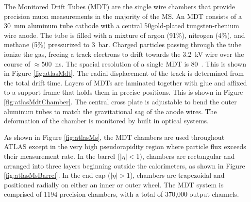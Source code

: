 \begin{figure}[h!]
\captionsetup[subfigure]{position=b}
\centering
{}
\caption{}
\label{fig:}
\end{figure}

The Monitored Drift Tubes (MDT) are the single wire chambers that provide precision muon measurements in the majority of the MS.
An MDT consists of a 30~mm aluminum tube cathode with a central 50\um gold-plated tungsten-rhenium wire anode.
The tube is filled with a mixture of argon (91\%), nitrogen (4\%), and methane (5\%) pressurized to 3~bar.
Charged particles passing through the tube ionize the gas, freeing a track electrons to drift towards the 3.2~kV wire over the course of $\approx500$~ns.
The spacial resolution of a single MDT is 80~\um.
This is shown in Figure \ref{fig:atlasMdt}.
The radial displacement of the track is determined from the total drift time.
Layers of MDTs are laminated together with glue and affixed to a support frame that holds them in precise positions.
This is shown in Figure \ref{fig:atlasMdtChamber}.
The central cross plate is adjustable to bend the outer aluminum tubes to match the gravitational sag of the anode wires.
The deformation of the chamber is monitored by built in optical systems.

As shown in Figure \ref{fig:atlasMs}, the MDT chambers are used throughout ATLAS except in the very high pseudorapidity region where particle flux exceeds their measurement rate.
In the barrel ($|\eta|<1$), chambers are rectangular and arranged into three layers beginning outside the calorimeters, as shown in Figure \ref{fig:atlasMsBarrel}.
In the end-cap ($|\eta|>1$), chambers are trapezoidal and positioned radially on either an inner or outer wheel.
The MDT system is comprised of 1194 precision chambers, with a total of 370,000 output channels.

